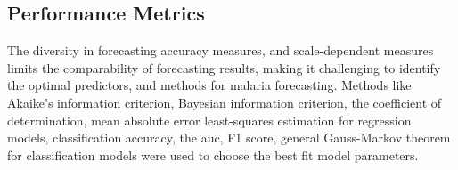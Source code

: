 \documentclass[a4paper, 12pt, twoside]{report}
\begin{document}
\subsection{Performance Metrics}%
\label{par:performance_metrics}
The diversity in forecasting accuracy measures, and scale-dependent measures limits the comparability of forecasting results, making it challenging to identify the optimal predictors, and methods for malaria forecasting.
Methods like Akaike’s information criterion, Bayesian information criterion, the coefficient of determination, mean absolute error least-squares estimation for regression models, classification accuracy, the \gls{auc}, F1 score, general Gauss-Markov theorem for classification models were used to choose the best fit model parameters.
%
%
%
\end{document}

